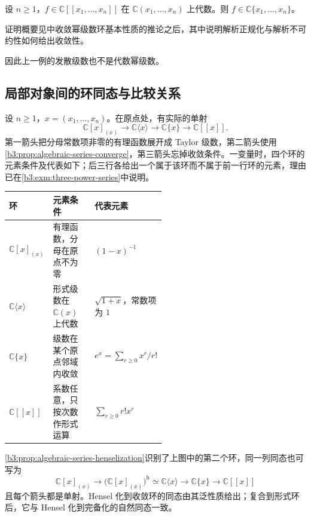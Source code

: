 \begin{proposition}\label{b3:prop:algebraic-series-converge}
	设 \(n\ge1\)，\(f\in\mathbb C[\![x_1,\ldots,x_n]\!]\) 在 \(\mathbb C(x_1,\ldots,x_n)\) 上代数。则 \(f\in\mathbb C\{x_1,\ldots,x_n\}\)。
\end{proposition}
证明概要见中收敛幂级数环基本性质的推论之后，其中说明解析正规化与解析不可约性如何给出收敛性。

因此上一例的发散级数也不是代数幂级数。

\subsection{局部对象间的环同态与比较关系}
\label{b3:subsec:D01:04}

设 \(n\ge1\)，\(x=(x_1,\ldots,x_n)\)。在原点处，有实际的单射
\[
	\mathbb C[x]_{(x)} \longrightarrow\mathbb C\langle x\rangle \longrightarrow\mathbb C\{x\} \longrightarrow\mathbb C[\![x]\!].
\]
第一箭头把分母常数项非零的有理函数展开成 Taylor 级数，第二箭头使用\cref{b3:prop:algebraic-series-converge}，第三箭头忘掉收敛条件。一变量时，四个环的元素条件及代表如下；后三行各给出一个属于该环而不属于前一行环的元素，理由已在\cref{b3:exm:three-power-series}中说明。

\begin{center}
	\begin{tabularx}{\linewidth}{@{}>{\raggedright\arraybackslash}p{0.25\linewidth}>{\raggedright\arraybackslash}X>{\raggedright\arraybackslash}p{0.27\linewidth}@{}}
		\toprule
		环 & 元素条件 & 代表元素 \\
		\midrule
		\(\mathbb C[x]_{(x)}\) & 有理函数，分母在原点不为零 & \((1-x)^{-1}\) \\
		\(\mathbb C\langle x\rangle\) & 形式级数在 \(\mathbb C(x)\) 上代数 & \(\sqrt{1+x}\)，常数项为 \(1\) \\
		\(\mathbb C\{x\}\) & 级数在某个原点邻域内收敛 & \(e^x=\sum_{r\ge0}x^r/r!\) \\
		\(\mathbb C[\![x]\!]\) & 系数任意，只按次数作形式运算 & \(\sum_{r\ge0}r!x^r\) \\
		\bottomrule
	\end{tabularx}
\end{center}

\ProseParagraphBreak
\cref{b3:prop:algebraic-series-henselization}识别了上图中的第二个环，同一列同态也可写为
\[
	\mathbb C[x]_{(x)} \longrightarrow\bigl(\mathbb C[x]_{(x)}\bigr)^{\mathrm h} \simeq\mathbb C\langle x\rangle \longrightarrow\mathbb C\{x\} \longrightarrow\mathbb C[\![x]\!]
\]
且每个箭头都是单射。Hensel 化到收敛环的同态由其泛性质给出；复合到形式环后，它与 Hensel 化到完备化的自然同态一致。

